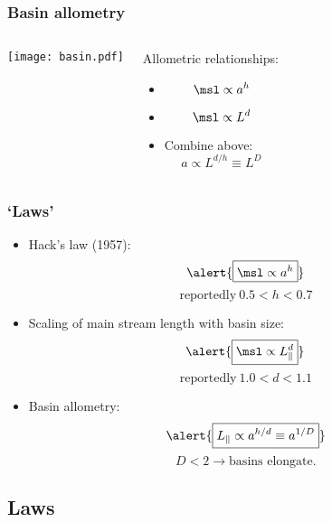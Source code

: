 \begin{frame}[label=]
  \frametitle{Basin allometry}

  \begin{columns}
    \texttt{[image: basin.pdf]}
    \begin{block}{Allometric relationships:}
      \begin{itemize}
      \item<2-> 
        $$\msl \propto a^h$$
      \item<3-> 
        $$\msl \propto L^d$$
      \item<4-> Combine above:
        $$ a \propto  L^{d/h} \equiv L^{D}$$
      \end{itemize}
    \end{block}
  \end{columns}
\end{frame}

\begin{frame}[label=]
  \frametitle{`Laws'}

  \begin{itemize}
  \item<1->   Hack's law (1957)\cite{hack1957a}:  
    $$ \alert{\boxed{\msl \propto a^h}}$$
    $$ \mbox{reportedly} \ 0.5 < h < 0.7 $$
  \item<2->   Scaling of main stream length with basin size:
    $$ \alert{\boxed{\msl \propto L_\parallel^d}} $$
    $$ \mbox{reportedly} \ 1.0 < d < 1.1 $$
  \item<3->   Basin allometry:
    $$ \alert{\boxed{L_\parallel \propto a^{h/d} \equiv a^{1/D}}}$$
    $$D < 2 \rightarrow \mbox{basins elongate}.$$
  \end{itemize}

\end{frame}

\subsection{Laws}

